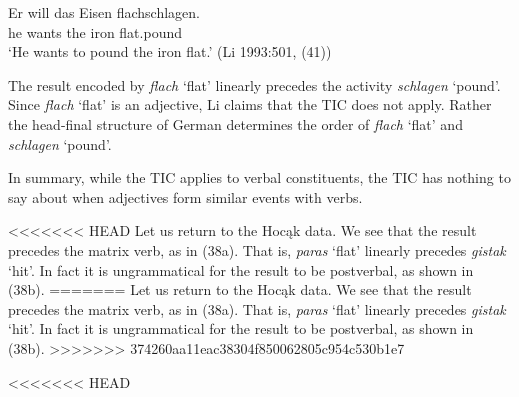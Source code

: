 \documentclass[output=paper]{LSP/langsci}
\begin{document}
\begin{exe}
\begin{exe}
\begin{exe}
\begin{exe}
{\begin{exe}
\begin{exe}

\ex \gll Er will das Eisen flachschlagen.\\
he wants the iron flat.pound\\
\glt `He wants to pound the iron flat.' (Li 1993:501, (41))

\end{exe}

The result encoded by \textit{flach} `flat' linearly precedes the activity \textit{schlagen} `pound'. Since \textit{flach} `flat' is an adjective, Li claims that the TIC does not apply. Rather the head-final structure of German determines the order of \textit{flach} `flat' and \textit{schlagen} `pound'. 

In summary, while the TIC applies to verbal constituents, the TIC has nothing to say about when adjectives form similar events with verbs.

<<<<<<< HEAD
Let us return to the Hocąk data. We see that the result precedes the matrix verb, as in (38a). That is, \textit{paras} `flat' linearly precedes \textit{gistak} `hit'. In fact it is ungrammatical for the result to be postverbal, as shown in (38b).
=======
Let us return to the Hoc\k{a}k data. We see that the result precedes the matrix verb, as in (38a). That is, \textit{paras} `flat' linearly precedes \textit{gistak} `hit'. In fact it is ungrammatical for the result to be postverbal, as shown in (38b).
>>>>>>> 374260aa11eac38304f850062805c954c530b1e7

\begin{exe}
\ex
\begin{xlist}

<<<<<<< HEAD

\end{xlist}
\end{exe}
\end{exe}}
\end{exe}
\end{exe}
\end{exe}
\end{exe}
\end{document}
